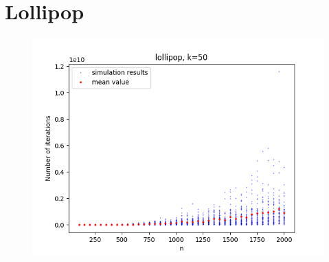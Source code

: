 \documentclass{article}
\begin{document}
\section{Lollipop}
\begin{figure}[htp]
  \centering
    \includegraphics[width=0.5\linewidth]{lollipop.png}
    \label{fig:lollipop}
\end{figure}
\end{document}
